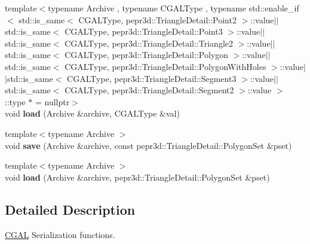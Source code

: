 \begin{DoxyCompactItemize}
\item 
\mbox{\label{namespace_c_g_a_l_a93d6224c7b97b6299661cf57858bb8a3}} 
{\footnotesize template$<$typename Archive , typename C\+G\+A\+L\+Type , typename std\+::enable\+\_\+if$<$ std\+::is\+\_\+same$<$ C\+G\+A\+L\+Type, pepr3d\+::\+Triangle\+Detail\+::\+Point2 $>$\+::value$\vert$$\vert$std\+::is\+\_\+same$<$ C\+G\+A\+L\+Type, pepr3d\+::\+Triangle\+Detail\+::\+Point3 $>$\+::value$\vert$$\vert$std\+::is\+\_\+same$<$ C\+G\+A\+L\+Type, pepr3d\+::\+Triangle\+Detail\+::\+Triangle2 $>$\+::value$\vert$$\vert$std\+::is\+\_\+same$<$ C\+G\+A\+L\+Type, pepr3d\+::\+Triangle\+Detail\+::\+Polygon $>$\+::value$\vert$$\vert$std\+::is\+\_\+same$<$ C\+G\+A\+L\+Type, pepr3d\+::\+Triangle\+Detail\+::\+Polygon\+With\+Holes $>$\+::value$\vert$$\vert$std\+::is\+\_\+same$<$ C\+G\+A\+L\+Type, pepr3d\+::\+Triangle\+Detail\+::\+Segment3 $>$\+::value$\vert$$\vert$std\+::is\+\_\+same$<$ C\+G\+A\+L\+Type, pepr3d\+::\+Triangle\+Detail\+::\+Segment2 $>$\+::value $>$\+::type $\ast$  = nullptr$>$ }\\void {\bfseries load} (Archive \&archive, C\+G\+A\+L\+Type \&val)
\item 
\mbox{\label{namespace_c_g_a_l_a582a086ee26975a477777f127a3c5560}} 
{\footnotesize template$<$typename Archive $>$ }\\void {\bfseries save} (Archive \&archive, const pepr3d\+::\+Triangle\+Detail\+::\+Polygon\+Set \&pset)
\item 
\mbox{\label{namespace_c_g_a_l_ae04ec9592d6f4f00d5c6c5aa1d9d5307}} 
{\footnotesize template$<$typename Archive $>$ }\\void {\bfseries load} (Archive \&archive, pepr3d\+::\+Triangle\+Detail\+::\+Polygon\+Set \&pset)
\end{DoxyCompactItemize}


\subsection{Detailed Description}
\mbox{\hyperlink{namespace_c_g_a_l}{C\+G\+AL}} Serialization functions. 